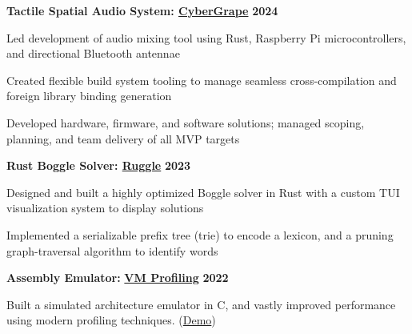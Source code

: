 \documentclass[10pt]{article}
\newenvironment{mylist}[1][]
{\itemize[nosep, wide=0pt, leftmargin=*, after=\strut]}
{\enditemize}
\begin{document}
\begin{minipage}[t]{\linewidth}
    \textbf{Tactile Spatial Audio System: \href{https://sgilfeather.github.io/CyberGrape/cybergrape/index.html}{CyberGrape}} \hfill \textbf{2024}
    \begin{mylist}
        \item Led development of audio mixing tool using Rust, Raspberry Pi microcontrollers, and directional Bluetooth antennae
        \item Created flexible build system tooling to manage seamless cross-compilation and foreign library binding generation
        \item Developed hardware, firmware, and software solutions; managed scoping, planning, and team delivery of all MVP targets
    \end{mylist}
\end{minipage}

\begin{minipage}[t]{\linewidth}
    \textbf{Rust Boggle Solver: \href{https://github.com/liam-strand/ruggle}{Ruggle}} \hfill \textbf{2023}
    \begin{mylist}
        \item Designed and built a highly optimized Boggle solver in Rust with a custom TUI visualization system to display solutions
        \item Implemented a serializable prefix tree (trie) to encode a lexicon, and a pruning graph-traversal algorithm to identify words
    \end{mylist}
\end{minipage}

\begin{minipage}[t]{\linewidth}
    \textbf{Assembly Emulator:} \href{https://github.com/liam-strand/comp-40-VM-Profiling}{\textbf{VM Profiling}} \hfill \textbf{2022}
    \begin{mylist}
        \item Built a simulated architecture emulator in C, and vastly improved performance using modern profiling techniques. (\href{https://youtu.be/OnzkSmFvxiM}{Demo})
    \end{mylist}
\end{minipage}

\end{document}
